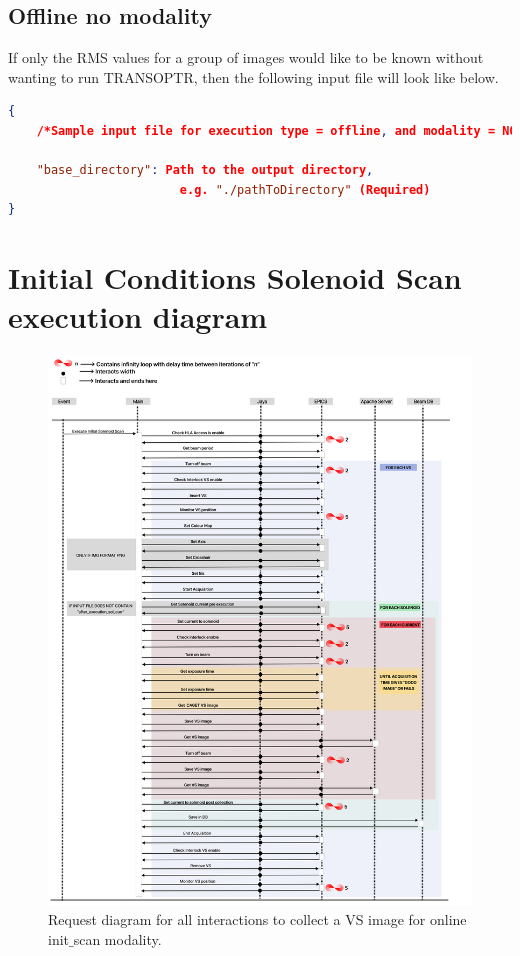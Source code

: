 \documentclass{article}
\begin{document}
\subsection{Offline no modality}
If only the RMS values for a group of images would like to be known without wanting to run TRANSOPTR, then the following input file will look like below. 
\begin{lstlisting}[language=json,firstnumber=0]
{
    /*Sample input file for execution type = offline, and modality = NONE */
    
    "base_directory": Path to the output directory, 
                        e.g. "./pathToDirectory" (Required)
}
\end{lstlisting}
\newpage 
\section{Initial Conditions Solenoid Scan execution diagram} \label{appendix:init_exe}
\begin{figure}[!h]  
  \centering
  \includegraphics[width=\linewidth]{images/init_conditions.png}
  \caption{Request diagram for all interactions to collect a VS image for online init$\_$scan modality.}
  \label{fig:99}
\end{figure} 
\newpage
\end{document}
